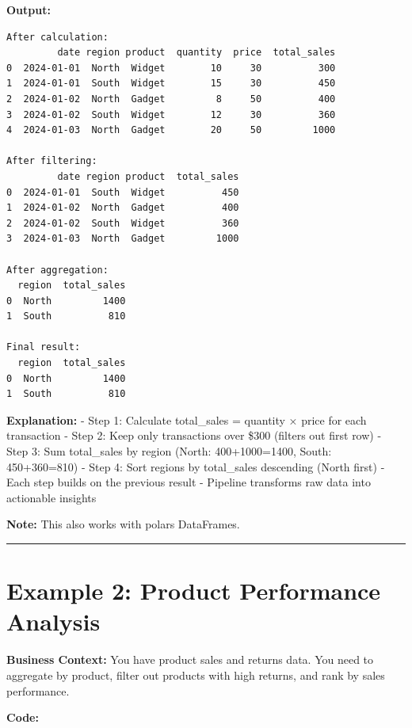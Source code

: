 \documentclass[
  letterpaper,
]{scrbook}
\begin{document}
\textbf{Output:}

\begin{verbatim}
After calculation:
         date region product  quantity  price  total_sales
0  2024-01-01  North  Widget        10     30          300
1  2024-01-01  South  Widget        15     30          450
2  2024-01-02  North  Gadget         8     50          400
3  2024-01-02  South  Widget        12     30          360
4  2024-01-03  North  Gadget        20     50         1000

After filtering:
         date region product  total_sales
0  2024-01-01  South  Widget          450
1  2024-01-02  North  Gadget          400
2  2024-01-02  South  Widget          360
3  2024-01-03  North  Gadget         1000

After aggregation:
  region  total_sales
0  North         1400
1  South          810

Final result:
  region  total_sales
0  North         1400
1  South          810
\end{verbatim}

\textbf{Explanation:} - Step 1: Calculate total\_sales = quantity ×
price for each transaction - Step 2: Keep only transactions over \$300
(filters out first row) - Step 3: Sum total\_sales by region (North:
400+1000=1400, South: 450+360=810) - Step 4: Sort regions by
total\_sales descending (North first) - Each step builds on the previous
result - Pipeline transforms raw data into actionable insights

\textbf{Note:} This also works with polars DataFrames.

\begin{center}\rule{0.5\linewidth}{0.5pt}\end{center}

\section{Example 2: Product Performance
Analysis}\label{example-2-product-performance-analysis}

\textbf{Business Context:} You have product sales and returns data. You
need to aggregate by product, filter out products with high returns, and
rank by sales performance.

\textbf{Code:}
\end{document}
